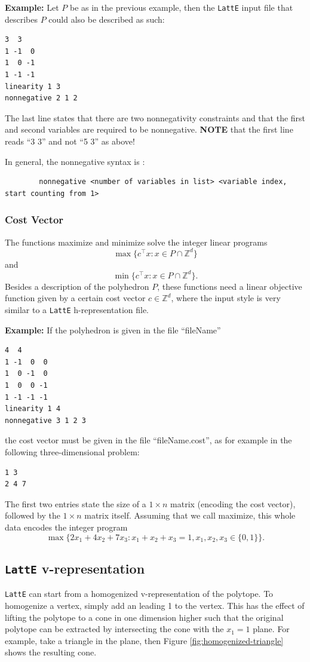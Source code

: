 \documentclass{article}
\newcommand{\Z}{{\mathbb Z}}
\newcommand{\latte}{{\tt LattE}\xspace}
\newcommand{\example}{{\bf Example:\space}}
\begin{document}
\example
Let $P$ be as in the previous example, then the {\tt LattE} input file
that describes $P$ could also be described as such: 
\begin{verbatim}
3  3
1 -1  0
1  0 -1
1 -1 -1
linearity 1 3
nonnegative 2 1 2
\end{verbatim}
The last line states that there are two nonnegativity constraints and
that the first and second variables are required to be nonnegative. 
{\bf NOTE} that the first line reads ``3 3'' and not ``5 3'' as above! 

In general, the nonnegative syntax is :
\begin{verbatim}
        nonnegative <number of variables in list> <variable index, start counting from 1>
\end{verbatim}


\subsubsection{Cost Vector}
The functions maximize and minimize solve the integer linear programs
\[
\max\{c^\intercal x: x\in P\cap\Z^d\}
\]
and
\[
\min\{c^\intercal x: x\in P\cap\Z^d\}.
\]
Besides a description of the polyhedron $P$, these functions need a
linear objective function given by a certain cost vector $c \in \Z^d$, where the input style is very similar to a \latte h-representation file. 

\example 
If the polyhedron is given in the file ``fileName''

\begin{verbatim}
4  4
1 -1  0  0
1  0 -1  0
1  0  0 -1
1 -1 -1 -1
linearity 1 4
nonnegative 3 1 2 3
\end{verbatim}
the cost vector must be given in the file ``fileName.cost'', as for
example in the following three-dimensional problem: 
\begin{verbatim}
1 3
2 4 7
\end{verbatim}
The first two entries state the size of a $1\times n$ matrix (encoding
the cost vector), followed by the $1\times n$ matrix itself. Assuming
that we call maximize, this whole data encodes the integer program
\[
\max\{2x_1+4x_2+7x_3: x_1+x_2+x_3=1, x_1,x_2,x_3\in\{0,1\}\}.
\]


\subsection{\latte v-representation}

\latte can start from a homogenized v-representation of the polytope. To homogenize a vertex, simply add an leading 1 to the vertex. This has the effect of lifting the polytope to a cone in one dimension higher such that the original polytope can be extracted by intersecting the cone with the $x_1 = 1$ plane. For example, take a triangle in the plane, then Figure \ref{fig:homogenized-triangle} shows the resulting cone.
\end{document}

